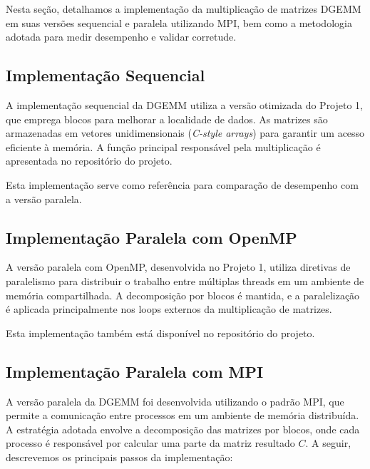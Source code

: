 \documentclass[12pt, a4paper]{article}
\begin{document}
    Nesta seção, detalhamos a implementação da multiplicação de matrizes DGEMM em suas versões sequencial e paralela utilizando MPI, bem como a metodologia adotada para medir desempenho e validar corretude.

    \subsection{Implementação Sequencial}

    A implementação sequencial da DGEMM utiliza a versão otimizada do Projeto 1, que emprega blocos para melhorar a localidade de dados. As matrizes são armazenadas em vetores unidimensionais (\textit{C-style arrays}) para garantir um acesso eficiente à memória. A função principal responsável pela multiplicação é apresentada no repositório do projeto.\footnotemark[1]

    Esta implementação serve como referência para comparação de desempenho com a versão paralela.

    \subsection{Implementação Paralela com OpenMP}

    A versão paralela com OpenMP, desenvolvida no Projeto 1, utiliza diretivas de paralelismo para distribuir o trabalho entre múltiplas threads em um ambiente de memória compartilhada. A decomposição por blocos é mantida, e a paralelização é aplicada principalmente nos loops externos da multiplicação de matrizes. 
    
    Esta implementação também está disponível no repositório do projeto.\footnotemark[1]

    \subsection{Implementação Paralela com MPI}

    A versão paralela da DGEMM foi desenvolvida utilizando o padrão MPI, que permite a comunicação entre processos em um ambiente de memória distribuída. A estratégia adotada envolve a decomposição das matrizes por blocos, onde cada processo é responsável por calcular uma parte da matriz resultado $C$. A seguir, descrevemos os principais passos da implementação:
    
\end{document}
